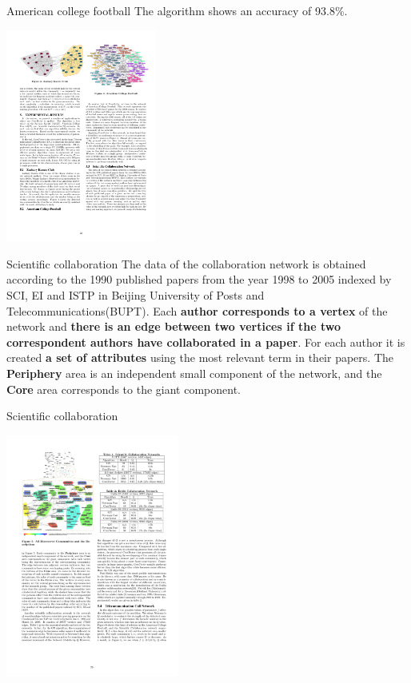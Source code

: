 \begin{frame}{American college football}
The algorithm shows an accuracy of 93.8\%.
\begin{center}
	\includegraphics[height=7cm]{images/americanCollegeFootball.pdf}
\end{center}
\end{frame}

\begin{frame}{Scientific collaboration}
\vskip 0.5cm
The data of the collaboration network is obtained according to the 1990 published papers from the year 1998 to 2005 indexed by SCI, EI and ISTP in Beijing University of Posts and Telecommunications(BUPT).
\vskip 0.6cm
Each \textbf{author corresponds to a vertex} of the network and \textbf{there is an edge between two vertices if the two correspondent authors have collaborated in a paper}.
\vskip 1cm
For each author it is created \textbf{a set of attributes} using the most relevant term in their papers.
\vskip 0.6cm
The \textbf{Periphery} area is an independent small component of the network, and the \textbf{Core} area corresponds to the giant component.
\end{frame}

\begin{frame}{Scientific collaboration}
\begin{center}
	\includegraphics[height=8cm]{images/scientificCollaboration.pdf}
\end{center}
\end{frame}
